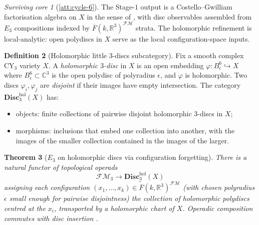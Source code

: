 \documentclass[11pt]{article}
\newtheorem{theorem}{Theorem}[section]
\theoremstyle{definition}
\newtheorem{definition}[theorem]{Definition}
\theoremstyle{remark}
\newtheorem{survivor}[theorem]{Surviving core}
\newcommand{\FMbar}{\overline{F}}
\newcommand{\FM}{\mathcal{FM}}
\newcommand{\CY}{\mathrm{CY}}
\begin{document}
\begin{survivor}[\ref{att:cycle-6}]
The Stage-$1$ output is a Costello--Gwilliam factorisation algebra
on $X$ in the sense of \cite{CostelloGwilliam2017, CostelloGwilliam2021},
with disc observables assembled from $E_3$ compositions indexed by
$\FMbar(k, \mathbb{R}^3)^{\FM}$ strata. The holomorphic refinement
is local-analytic: open polydiscs in $X$ serve as the local
configuration-space inputs.
\end{survivor}

\begin{definition}[Holomorphic little $3$-discs subcategory]
\label{def:hol-disks}
Fix a smooth complex $\CY_3$ variety $X$. A \emph{holomorphic
$3$-disc} in $X$ is an open embedding
$\varphi \colon B^6_\epsilon \hookrightarrow X$ where $B^6_\epsilon
\subset \mathbb{C}^3$ is the open polydisc of polyradius $\epsilon$,
and $\varphi$ is holomorphic. Two discs $\varphi_i, \varphi_j$ are
\emph{disjoint} if their images have empty intersection. The
category $\mathbf{Disc}_3^{\mathrm{hol}}(X)$ has:
\begin{itemize}
 \item objects: finite collections of pairwise disjoint holomorphic
       $3$-discs in $X$;
 \item morphisms: inclusions that embed one collection into another,
       with the images of the smaller collection contained in the
       images of the larger.
\end{itemize}
\end{definition}

\begin{theorem}[$E_3$ on holomorphic discs via configuration forgetting]
\label{thm:fm-to-disks}
There is a natural functor of topological operads
\[
 \FM_3 \longrightarrow \mathbf{Disc}_3^{\mathrm{hol}}(X)
\]
assigning each configuration
$(x_1, \ldots, x_k) \in \widetilde{\FMbar}(k, \mathbb{R}^3)^{\FM}$
(with chosen polyradius $\epsilon$ small enough for pairwise disjointness)
the collection of holomorphic polydiscs centred at the $x_i$, transported
by a holomorphic chart of $X$. Operadic composition commutes with
disc insertion \cite[Costello--Gwilliam 2021, Ch.\ 3]{CostelloGwilliam2021}.
\end{theorem}
\end{document}
